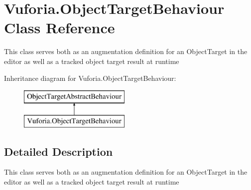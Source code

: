 \hypertarget{class_vuforia_1_1_object_target_behaviour}{}\section{Vuforia.\+Object\+Target\+Behaviour Class Reference}
\label{class_vuforia_1_1_object_target_behaviour}


This class serves both as an augmentation definition for an Object\+Target in the editor as well as a tracked object target result at runtime  


Inheritance diagram for Vuforia.\+Object\+Target\+Behaviour\+:\begin{figure}[H]
\begin{center}
\leavevmode
\includegraphics[height=2.000000cm]{class_vuforia_1_1_object_target_behaviour}
\end{center}
\end{figure}


\subsection{Detailed Description}
This class serves both as an augmentation definition for an Object\+Target in the editor as well as a tracked object target result at runtime 

